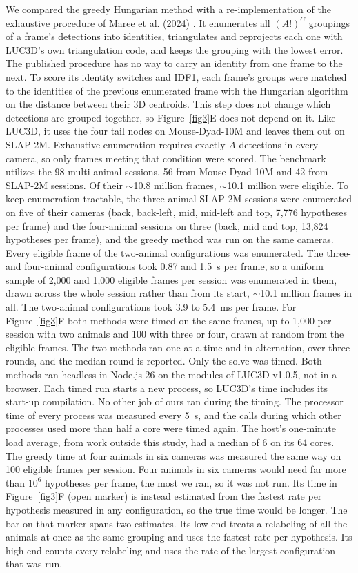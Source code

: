 \documentclass[pdflatex, sn-nature]{sn-jnl}
\theoremstyle{thmstyleone}%
\theoremstyle{thmstyletwo}%
\theoremstyle{thmstylethree}%
\begin{document}
We compared the greedy Hungarian method with a re-implementation of the exhaustive procedure of Maree et al. (2024) \citep{Maree2024}. It enumerates all $(A!)^C$ groupings of a frame's detections into identities, triangulates and reprojects each one with LUC3D's own triangulation code, and keeps the grouping with the lowest error. The published procedure has no way to carry an identity from one frame to the next. To score its identity switches and IDF1, each frame's groups were matched to the identities of the previous enumerated frame with the Hungarian algorithm on the distance between their 3D centroids. This step does not change which detections are grouped together, so Figure~\ref{fig3}E does not depend on it. Like LUC3D, it uses the four tail nodes on Mouse-Dyad-10M and leaves them out on SLAP-2M. Exhaustive enumeration requires exactly $A$ detections in every camera, so only frames meeting that condition were scored. The benchmark utilizes the 98 multi-animal sessions, 56 from Mouse-Dyad-10M and 42 from SLAP-2M sessions. Of their $\sim$10.8 million frames, $\sim$10.1 million were eligible. To keep enumeration tractable, the three-animal SLAP-2M sessions were enumerated on five of their cameras (back, back-left, mid, mid-left and top, 7,776 hypotheses per frame) and the four-animal sessions on three (back, mid and top, 13,824 hypotheses per frame), and the greedy method was run on the same cameras. Every eligible frame of the two-animal configurations was enumerated. The three- and four-animal configurations took 0.87 and 1.5~s per frame, so a uniform sample of 2,000 and 1,000 eligible frames per session was enumerated in them, drawn across the whole session rather than from its start, $\sim$10.1 million frames in all. The two-animal configurations took 3.9 to 5.4~ms per frame. For Figure~\ref{fig3}F both methods were timed on the same frames, up to 1,000 per session with two animals and 100 with three or four, drawn at random from the eligible frames. The two methods ran one at a time and in alternation, over three rounds, and the median round is reported. Only the solve was timed. Both methods ran headless in Node.js 26 on the modules of LUC3D v1.0.5, not in a browser. Each timed run starts a new process, so LUC3D's time includes its start-up compilation. No other job of ours ran during the timing. The processor time of every process was measured every 5~s, and the calls during which other processes used more than half a core were timed again. The host's one-minute load average, from work outside this study, had a median of 6 on its 64 cores. The greedy time at four animals in six cameras was measured the same way on 100 eligible frames per session. Four animals in six cameras would need far more than $10^6$ hypotheses per frame, the most we ran, so it was not run. Its time in Figure~\ref{fig3}F (open marker) is instead estimated from the fastest rate per hypothesis measured in any configuration, so the true time would be longer. The bar on that marker spans two estimates. Its low end treats a relabeling of all the animals at once as the same grouping and uses the fastest rate per hypothesis. Its high end counts every relabeling and uses the rate of the largest configuration that was run.
 
\end{document}
